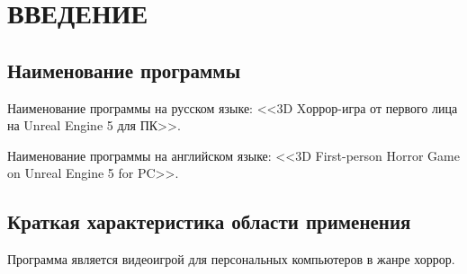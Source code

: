 \section{ВВЕДЕНИЕ}

\subsection{Наименование программы}

Наименование программы на русском языке: <<3D Xоррор-игра от первого лица на Unreal Engine 5 для ПК>>.

Наименование программы на английском языке: <<3D First-person Horror Game on Unreal Engine 5 for PC>>.

\subsection{Краткая характеристика области применения}

Программа является видеоигрой для персональных компьютеров в жанре хоррор. 